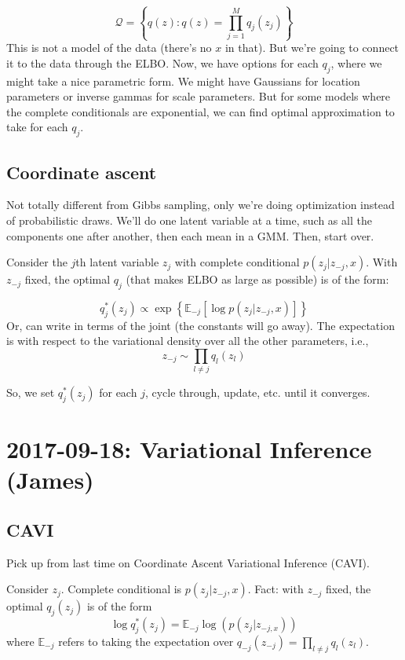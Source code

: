 \documentclass{article}
\newcommand{\E}{ \ensuremath{ \mathbb{E} }}
\begin{document}
\begin{equation*}
  \mathcal{Q}=\left\{q(z) : q(z)=\prod_{j=1}^M q_j(z_j)\right\}
\end{equation*}
This is not a model of the data (there's no $x$ in that). But we're going to connect it to the data
through the ELBO. Now, we have options for each $q_j$, where we might take a nice parametric form. We might have Gaussians for location parameters
or inverse gammas for scale parameters. But for some models where the complete conditionals are exponential, we can find optimal approximation to take for each $q_j$.

\subsection{Coordinate ascent}
Not totally different from Gibbs sampling, only we're doing optimization instead of probabilistic draws. We'll do
one latent variable at a time, such as all the components one after another, then each mean in a GMM. Then, start over.

Consider the $j$th latent variable $z_j$ with complete conditional $p(z_j|z_{-j}, x)$. With $z_{-j}$ fixed,
the optimal $q_j$ (that makes ELBO as large as possible) is of the form:

\begin{equation}
  q_j^*(z_j)\propto \exp\left\{ \E_{-j}\left[ \log p(z_j | z_{-j}, x)\right] \right\}
\end{equation}
Or, can write in terms of the joint (the constants will go away). The expectation is with
respect to the variational density over all the other parameters, i.e.,
\begin{equation*}
  z_{-j}\sim \prod_{l\neq j} q_l(z_l)
\end{equation*}

So, we set $q_j^*(z_j)$ for each $j$, cycle through, update, etc. until it converges.

\section{2017-09-18: Variational Inference (James)}

\subsection{CAVI}
Pick up from last time on Coordinate Ascent Variational Inference (CAVI).

Consider $z_j$. Complete conditional is $p(z_j | z_{-j}, x)$. Fact: with $z_{-j}$ fixed, the optimal $q_j(z_j)$
is of the form
\begin{equation*}
  \log q_j^*(z_j) =\E_{-j} \log(p(z_j | z_{-j, x}))
\end{equation*}
where $\E_{-j}$ refers to taking the expectation over $q_{-j}(z_{-j})=\prod_{l\neq j} q_l(z_l)$.
\end{document}
